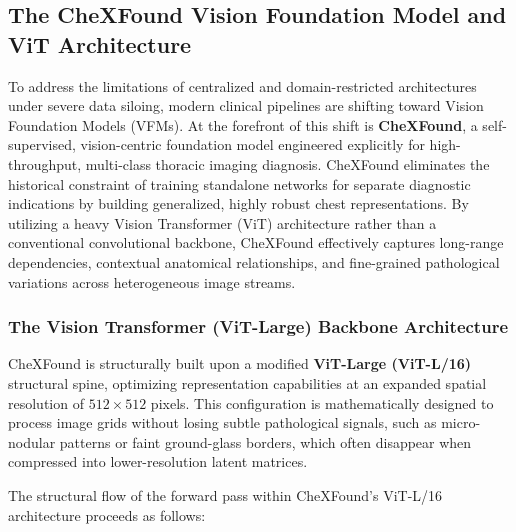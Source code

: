 \subsection{The CheXFound Vision Foundation Model and ViT Architecture}
\label{subsec:chexfound_vit}

To address the limitations of centralized and domain-restricted architectures under severe data siloing, modern clinical pipelines are shifting toward Vision Foundation Models (VFMs). At the forefront of this shift is \textbf{CheXFound}, a self-supervised, vision-centric foundation model engineered explicitly for high-throughput, multi-class thoracic imaging diagnosis. CheXFound eliminates the historical constraint of training standalone networks for separate diagnostic indications by building generalized, highly robust chest representations. By utilizing a heavy Vision Transformer (ViT) architecture rather than a conventional convolutional backbone, CheXFound effectively captures long-range dependencies, contextual anatomical relationships, and fine-grained pathological variations across heterogeneous image streams.

\subsubsection{The Vision Transformer (ViT-Large) Backbone Architecture}

CheXFound is structurally built upon a modified \textbf{ViT-Large (ViT-L/16)} structural spine, optimizing representation capabilities at an expanded spatial resolution of $512\times512$ pixels. This configuration is mathematically designed to process image grids without losing subtle pathological signals, such as micro-nodular patterns or faint ground-glass borders, which often disappear when compressed into lower-resolution latent matrices. 

The structural flow of the forward pass within CheXFound's ViT-L/16 architecture proceeds as follows:

